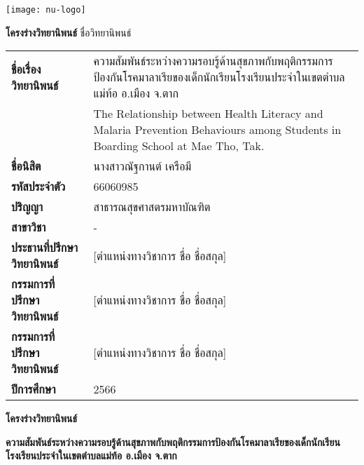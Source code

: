 \begin{titlepage}

  \begin{center}
    \texttt{[image: nu-logo]}
    
    \textbf{โครงร่างวิทยานิพนธ์}
   ชื่อวิทยานิพนธ์ 
  \end{center}


  \begin{table}[h]
    \centering
    \begin{tabular}{p{4cm} p{11cm}}
      \textbf{ชื่อเรื่องวิทยานิพนธ์} & ความสัมพันธ์ระหว่างความรอบรู้ด้านสุขภาพกับพฤติกรรมการป้องกันโรคมาลาเรียของเด็กนักเรียนโรงเรียนประจำในเขตตำบลแม่ท้อ อ.เมือง จ.ตาก \\

      &   The Relationship between Health Literacy and Malaria Prevention Behaviours among Students in Boarding School at Mae Tho, Tak. \\

      \textbf{ชื่อนิสิต} & นางสาวณัฐกานต์ เครือมี \\

      \textbf{รหัสประจำตัว}	& 66060985 \\

      \textbf{ปริญญา}	& สาธารณสุขศาสตรมหาบัณฑิต \\

      \textbf{สาขาวิชา}	& - \\

      \textbf{ประธานที่ปรึกษาวิทยานิพนธ์}	& [ตำแหน่งทางวิชาการ ชื่อ ชื่อสกุล] \\

      \textbf{กรรมการที่ปรึกษาวิทยานิพนธ์}	& [ตำแหน่งทางวิชาการ ชื่อ ชื่อสกุล] \\

      \textbf{กรรมการที่ปรึกษาวิทยานิพนธ์}	& [ตำแหน่งทางวิชาการ ชื่อ ชื่อสกุล] \\

      \textbf{ปีการศึกษา}	& 2566
    \end{tabular}
  \end{table}

  \newpage

  \centering\textbf{โครงร่างวิทยานิพนธ์}

  \raggedright\textbf{ความสัมพันธ์ระหว่างความรอบรู้ด้านสุขภาพกับพฤติกรรมการป้องกันโรคมาลาเรียของเด็กนักเรียนโรงเรียนประจำในเขตตำบลแม่ท้อ อ.เมือง จ.ตาก}


\end{titlepage}
